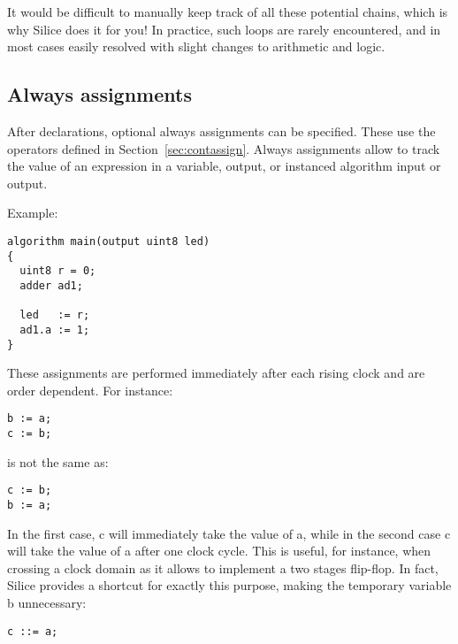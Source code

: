 \documentclass[a4]{article}
\newcommand\silice{Silice}
\begin{document}
It would be difficult to manually keep track of all these potential chains, which is why \silice{} does it for you! In practice, such loops are rarely encountered, and in most cases easily resolved with slight changes to arithmetic and logic.

\vspace*{5mm}
\noindent
{}


\subsection{Always assignments}

After declarations, optional always assignments can be specified.
These use the operators defined in Section~\ref{sec:contassign}.
%
Always assignments allow to track the value of an expression
in a variable, output, or instanced algorithm input or output.

\noindent Example:
\begin{verbatim}
algorithm main(output uint8 led)
{
  uint8 r = 0;
  adder ad1;

  led   := r;
  ad1.a := 1;
}
\end{verbatim}

\noindent These assignments are performed immediately after each rising clock and are order dependent. For instance:
\begin{verbatim}
b := a;
c := b;
\end{verbatim}
is not the same as:
\begin{verbatim}
c := b;
b := a;
\end{verbatim}
In the first case, c will immediately take the value of a, while in the second case
c will take the value of a after one clock cycle. This is useful, for instance, when
crossing a clock domain as it allows to implement a two stages flip-flop. In fact,
\silice{} provides a shortcut for exactly this purpose, making the temporary variable b unnecessary:

\begin{verbatim}
c ::= a;
\end{verbatim}

\end{document}
